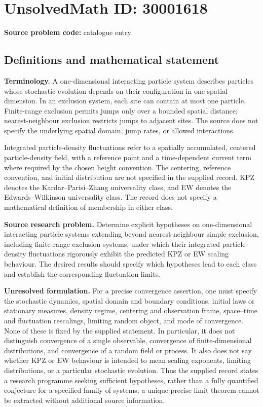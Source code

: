 \documentclass[11pt]{article}
\begin{document}
\section*{UnsolvedMath ID: 30001618}
\textbf{Source problem code:} catalogue entry
\subsection{Definitions and mathematical statement}
\textbf{Terminology.} A one-dimensional interacting particle system describes particles whose stochastic evolution depends on their configuration in one spatial dimension. In an exclusion system, each site can contain at most one particle. Finite-range exclusion permits jumps only over a bounded spatial distance; nearest-neighbour exclusion restricts jumps to adjacent sites. The source does not specify the underlying spatial domain, jump rates, or allowed interactions.

Integrated particle-density fluctuations refer to a spatially accumulated, centered particle-density field, with a reference point and a time-dependent current term where required by the chosen height convention. The centering, reference convention, and initial distribution are not specified in the supplied record. KPZ denotes the Kardar--Parisi--Zhang universality class, and EW denotes the Edwards--Wilkinson universality class. The record does not specify a mathematical definition of membership in either class.

\textbf{Source research problem.} Determine explicit hypotheses on one-dimensional interacting particle systems extending beyond nearest-neighbour simple exclusion, including finite-range exclusion systems, under which their integrated particle-density fluctuations rigorously exhibit the predicted KPZ or EW scaling behaviour. The desired results should specify which hypotheses lead to each class and establish the corresponding fluctuation limits.

\textbf{Unresolved formulation.} For a precise convergence assertion, one must specify the stochastic dynamics, spatial domain and boundary conditions, initial laws or stationary measures, density regime, centering and observation frame, space--time and fluctuation rescalings, limiting random object, and mode of convergence. None of these is fixed by the supplied statement. In particular, it does not distinguish convergence of a single observable, convergence of finite-dimensional distributions, and convergence of a random field or process. It also does not say whether KPZ or EW behaviour is intended to mean scaling exponents, limiting distributions, or a particular stochastic evolution. Thus the supplied record states a research programme seeking sufficient hypotheses, rather than a fully quantified conjecture for a specified family of systems; a unique precise limit theorem cannot be extracted without additional source information.
\end{document}
